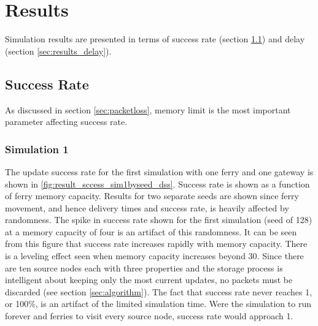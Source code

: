 \chapter{Results}
\label{sec:resultsChapter}

Simulation results are presented in terms of success rate (section \ref{sec:results_success_rate}) and delay (section \ref{sec:results_delay}).

\section{Success Rate}
\label{sec:results_success_rate}

As discussed in section \ref{sec:packetloss}, memory limit is the most important parameter affecting success rate. 

\subsection{Simulation 1}
\label{sec:results_success_scenario1}

The update success rate for the first simulation with one ferry and one gateway is shown in \ref{fig:result_sccess_sim1byseed_dss}.
Success rate is shown as a function of ferry memory capacity. 
Results for two separate seeds are shown since ferry movement, and hence delivery times and success rate, is heavily affected by randomness.
The spike in success rate shown for the first simulation (seed of 128) at a memory capacity of four is an artifact of this randomness.
It can be seen from this figure that success rate increases rapidly with memory capacity.
There is a leveling effect seen when memory capacity increases beyond 30.
Since there are ten source nodes each with three properties and the storage process is intelligent about keeping only the most current updates, no packets must be discarded (see section \ref{sec:algorithm}).
The fact that success rate never reaches 1, or 100\%, is an artifact of the limited simulation time.
Were the simulation to run forever and ferries to visit every source node, success rate would approach 1.

